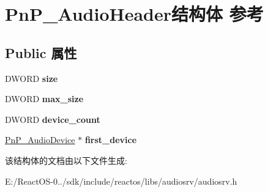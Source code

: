 \hypertarget{struct_pn_p___audio_header}{}\section{Pn\+P\+\_\+\+Audio\+Header结构体 参考}
\label{struct_pn_p___audio_header}
\subsection*{Public 属性}
\begin{DoxyCompactItemize}
\item 
\mbox{\label{struct_pn_p___audio_header_a97ab088c1d4f82cd5940bc64aa8ee45b}} 
D\+W\+O\+RD {\bfseries size}
\item 
\mbox{\label{struct_pn_p___audio_header_a89da4f6d40e92ca89659eccecc3ccc5f}} 
D\+W\+O\+RD {\bfseries max\+\_\+size}
\item 
\mbox{\label{struct_pn_p___audio_header_ad65e6b69e05fa595c79f8f3e1179ebe1}} 
D\+W\+O\+RD {\bfseries device\+\_\+count}
\item 
\mbox{\label{struct_pn_p___audio_header_a337ee90b547c3c48731089618a5f0943}} 
\hyperlink{struct_pn_p___audio_device}{Pn\+P\+\_\+\+Audio\+Device} $\ast$ {\bfseries first\+\_\+device}
\end{DoxyCompactItemize}


该结构体的文档由以下文件生成\+:\begin{DoxyCompactItemize}
\item 
E\+:/\+React\+O\+S-\/0../sdk/include/reactos/libs/audiosrv/audiosrv.\+h\end{DoxyCompactItemize}
